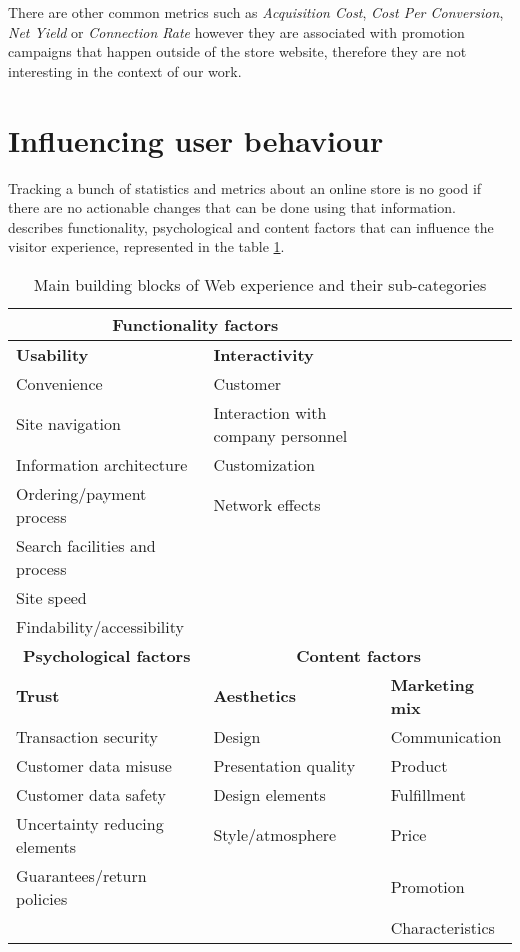 There are other common metrics such as \textit{Acquisition Cost}, \textit{Cost 
Per Conversion}, \textit{Net Yield} or \textit{Connection Rate} however they 
are associated with promotion campaigns that happen outside of the store 
website, therefore they are not interesting in the context of our work.

\section{Influencing user behaviour}

Tracking a bunch of statistics and metrics about an online store is no good if 
there are no actionable changes that can be done using that information. 
\cite{Constantinides2004} describes functionality, psychological and content 
factors that can influence the visitor experience, represented in the table 
\ref{tab:factors}.

\begin{table}[h]
    \centering
    \caption{Main building blocks of Web experience and their sub-categories 
    \cite{Constantinides2004}}
    \label{tab:factors}
    \begin{tabular}{@{}lll@{}}
\toprule
\multicolumn{2}{c}{\textbf{Functionality factors}} & \textbf{} \\ \midrule
\textbf{Usability} & \textbf{Interactivity} & \textbf{} \\ \midrule
Convenience & Customer &  \\
Site navigation & Interaction with company personnel &  \\
Information architecture & Customization &  \\
Ordering/payment process & Network effects &  \\
Search facilities and process &  &  \\
Site speed &  &  \\
Findability/accessibility &  &  \\ \midrule
\multicolumn{1}{c}{\textbf{Psychological factors}} & 
\multicolumn{2}{c}{\textbf{Content factors}} 
\\ \midrule
\textbf{Trust} & \textbf{Aesthetics} & \textbf{Marketing mix} \\ \midrule
Transaction security & Design & Communication \\
Customer data misuse & Presentation quality & Product \\
Customer data safety & Design elements & Fulfillment \\
Uncertainty reducing elements & Style/atmosphere & Price \\
Guarantees/return policies &  & Promotion \\
&  & Characteristics \\ \bottomrule
    \end{tabular}
\end{table}

